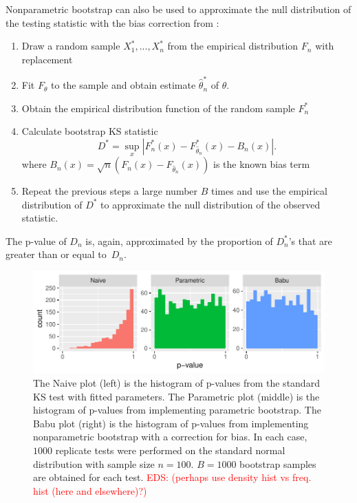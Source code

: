 \documentclass[12pt, letterpaper, titlepage]{article}
\newcommand{\eds}[1]{\textcolor{red}{EDS: (#1)}}
\begin{document}
Nonparametric bootstrap can also be used to approximate the null distribution
of the testing statistic with the bias correction from \citet{Babu}:
\begin{enumerate}
\item
  Draw a random sample $X_1^*,...,X_n^*$ from the empirical distribution $F_n$
  with replacement
\item
  Fit $F_\theta$ to the sample and obtain estimate $\hat\theta_n^*$ of $\theta$.
\item
  Obtain the empirical distribution function of the random sample $F_n^*$
\item
  Calculate bootstrap KS statistic
  \[
    D^* = \sup_x | F_n^* (x)- F_{\hat\theta_n}^*(x) - B_n(x) |.
  \]
  where $B_{n}(x) = \sqrt{n}(F_{n}(x) - F_{\hat\theta_n}(x))$ is the known
  bias term \citep{Babu}
\item
  Repeat the previous steps a large number $B$ times and use the empirical
  distribution of $D^*$ to approximate the null distribution of the observed
  statistic.
\end{enumerate}
The p-value of $D_n$ is, again, approximated by the proportion of $D_n^*$'s that
are greater than or equal to~$D_n$.



\begin{figure}[tbp]
  \centering
  \includegraphics[width=\textwidth]{hist_fitted}
  \caption{The Naive plot (left) is the histogram of p-values from the standard
  KS test with fitted parameters. The Parametric plot (middle) is the histogram
  of p-values from implementing parametric bootstrap. The Babu plot (right) is
  the histogram of p-values from implementing nonparametric bootstrap with a
  correction for bias. In each case, $1000$ replicate tests were performed on
  the standard normal distribution with sample size $n = 100$. $B = 1000$
  bootstrap samples are obtained for each test. \eds{perhaps use density hist vs
	freq. hist (here and elsewhere)?}}
  \label{fig:hist_fitted}
\end{figure}
\end{document}

